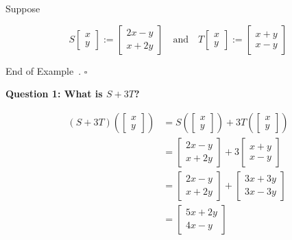 \documentclass[10pt]{article}
\theoremstyle{definition}
\newtheorem{example}[theorem]{Example}
\renewenvironment{example}
{\begin{oldexample}}
  {\par\smallskip\hfill   End of Example~\theexample. $\square$    \par\end{oldexample}}
\newcommand{\fl}[1]{\noindent\textbf{#1}}            %
\begin{document}
\begin{example}
  Suppose
  
  \begin{equation*}
    S
    \begin{bmatrix}
      x\\y
    \end{bmatrix}
    :=
    \begin{bmatrix}
      2x-y\\x+2y
    \end{bmatrix}
    \quad \text{and} \quad 
    T
    \begin{bmatrix}
      x\\y
    \end{bmatrix}
    :=
    \begin{bmatrix}
      x+y\\x-y
    \end{bmatrix}
  \end{equation*}
\end{example}
\fl{Question 1: What is $S+3T$?}

\begin{align*}
  (S+3T)\left(
  \begin{bmatrix}
    x\\y
  \end{bmatrix}
  \right) 
  &= S
    \left(\begin{bmatrix}
        x\\y
      \end{bmatrix}\right)
  +3T
  \left(\begin{bmatrix}
      x\\y
    \end{bmatrix}\right)\\
  &=
    \begin{bmatrix}
      2x-y\\
      x+2y
    \end{bmatrix}
  +3
  \begin{bmatrix}
    x+y\\
    x-y
  \end{bmatrix}\\
  &=
    \begin{bmatrix}
      2x-y\\x+2y
    \end{bmatrix}
  +
  \begin{bmatrix}
    3x+3y\\
    3x-3y
  \end{bmatrix}\\
  &=
    \begin{bmatrix}
      5x+2y\\
      4x-y
    \end{bmatrix}
\end{align*}
\end{document}

